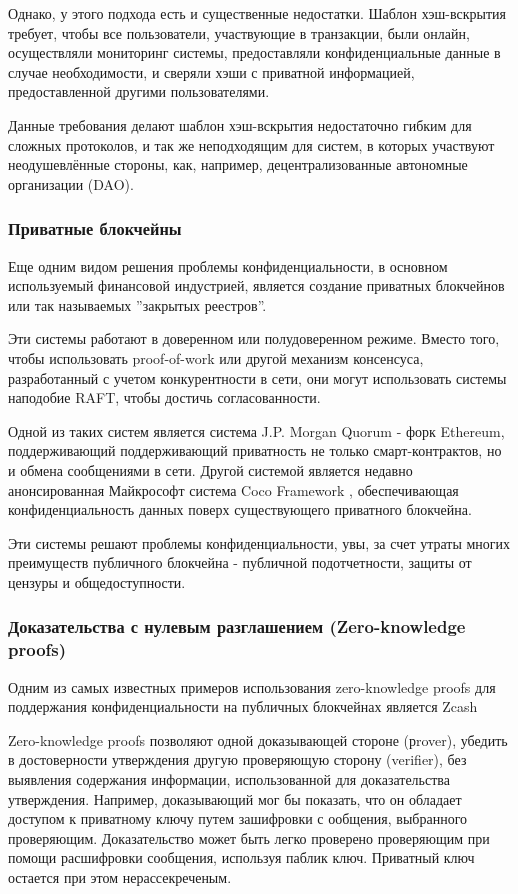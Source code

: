 \documentclass[russian,english,11pt]{article}
\begin{document}
Однако, у этого подхода есть и существенные недостатки. Шаблон 
хэш-вскрытия требует, чтобы все пользователи, участвующие в 
транзакции, были онлайн, осуществляли мониторинг системы, предоставляли 
конфиденциальные данные в случае необходимости, и сверяли хэши с 
приватной информацией, предоставленной другими пользователями.

Данные требования делают шаблон хэш-вскрытия недостаточно гибким для 
сложных протоколов, и так же неподходящим для систем, в которых 
участвуют неодушевлённые  стороны, как, например, децентрализованные 
автономные организации (DAO).

\subsubsection{Приватные блокчейны}

Еще одним видом решения проблемы конфиденциальности, в основном 
используемый финансовой индустрией, является создание приватных 
блокчейнов или так называемых ”закрытых реестров”.

Эти системы работают  в доверенном  или полудоверенном  режиме. Вместо 
того, чтобы использовать proof-of-work или другой механизм консенсуса, 
разработанный с учетом конкурентности в сети, они могут использовать 
системы наподобие RAFT, чтобы достичь согласованности.

Одной из таких систем является система J.P. Morgan Quorum \cite{quorum}- 
форк Ethereum, поддерживающий поддерживающий приватность не только 
смарт-контрактов, но и обмена сообщениями в сети. Другой системой 
является недавно анонсированная Майкрософт система Coco Framework \cite{coco}, 
обеспечивающая конфиденциальность данных поверх существующего 
приватного блокчейна.

Эти системы решают проблемы конфиденциальности, увы, за счет утраты 
многих преимуществ публичного блокчейна - публичной подотчетности, 
защиты от цензуры и общедоступности. 

\subsubsection{Доказательства с нулевым разглашением (Zero-knowledge proofs)}

Одним из самых известных примеров использования zero-knowledge proofs 
для поддержания конфиденциальности на публичных блокчейнах является Zcash \cite{zcash} 

Zero-knowledge proofs позволяют одной доказывающей стороне (рrover), 
убедить в достоверности утверждения другую проверяющую сторону 
(verifier), без выявления содержания информации, использованной для 
доказательства утверждения. Например, доказывающий мог бы показать,
что он обладает доступом к приватному ключу путем зашифровки с
ообщения, выбранного проверяющим. Доказательство может быть легко 
проверено проверяющим при помощи расшифровки сообщения, используя 
паблик ключ. Приватный ключ остается при этом нерассекреченым.
\end{document}
